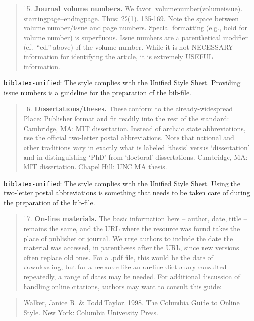\documentclass[
]{article}
\begin{document}
\begin{quote}
15. \textbf{Journal volume numbers.} We favor:
volumenumber(volumeissue). startingpage--endingpage. Thus: 22(1).
135-169. Note the space between volume number/issue and page numbers.
Special formatting (e.g., bold for volume number) is superfluous. Issue
numbers are a parenthetical modifier (cf.~``ed.'' above) of the volume
number. While it is not NECESSARY information for identifying the
article, it is extremely USEFUL information.
\end{quote}

\texttt{biblatex-unified}: The style complies with the Unified Style
Sheet. Providing issue numbers is a guideline for the preparation of the
bib-file.

\begin{quote}
16. \textbf{Dissertations/theses.} These conform to the
already-widespread Place: Publisher format and fit readily into the rest
of the standard: Cambridge, MA: MIT dissertation. Instead of archaic
state abbreviations, use the official two-letter postal abbreviations.
Note that national and other traditions vary in exactly what is labeled
`thesis' versus `dissertation' and in distinguishing `PhD' from
`doctoral' dissertations. Cambridge, MA: MIT dissertation. Chapel Hill:
UNC MA thesis.
\end{quote}

\texttt{biblatex-unified}: The style complies with the Unified Style
Sheet. Using the two-letter postal abbreviations is something that needs
to be taken care of during the preparation of the bib-file.

\begin{quote}
17. \textbf{On-line materials.} The basic information here -- author,
date, title -- remains the same, and the URL where the resource was
found takes the place of publisher or journal. We urge authors to
include the date the material was accessed, in parentheses after the
URL, since new versions often replace old ones. For a .pdf file, this
would be the date of downloading, but for a resource like an on-line
dictionary consulted repeatedly, a range of dates may be needed. For
additional discussion of handling online citations, authors may want to
consult this guide:
\end{quote}

\begin{quote}
Walker, Janice R. \& Todd Taylor. 1998. The Columbia Guide to Online
Style. New York: Columbia University Press.
\end{quote}
\end{document}
